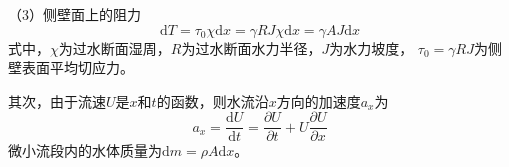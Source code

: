                                                         （3）侧壁面上的阻力
                                                        \begin{equation}
                                                          \mathrm{d}T
                                                          =
                                                          \tau_{0}\chi\mathrm{d}x
                                                          =
                                                          \gamma RJ\chi\mathrm{d}x
                                                          =
                                                          \gamma AJ\mathrm{d}x
                                                        \end{equation}
                                                        式中，$\chi$为过水断面湿周，$R$为过水断面水力半径，$J$为水力坡度，
                                                        $\tau_{0}=\gamma RJ$为侧壁表面平均切应力。

                                                        其次，由于流速$U$是$x$和$t$的函数，则水流沿$x$方向的加速度$a_{x}$为
                                                        \begin{equation}
                                                          a_{x}
                                                          =
                                                          \frac{\mathrm{d} U}{\mathrm{d} t}
                                                          =
                                                          \frac{\partial U}{\partial t}
                                                          +
                                                          U
                                                          \frac{\partial U}{\partial x}
                                                        \end{equation}
                                                        微小流段内的水体质量为$\mathrm{d}m=\rho A\mathrm{d}x$。

